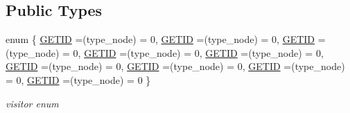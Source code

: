 \subsection*{Public Types}
\begin{DoxyCompactItemize}
\item 
enum \{ \newline
\hyperlink{structrecord__type_a2a26a4b7792dfcbb8940e4c0dac57a80a2d57bfbcb559e66da1b14d2db6e9d45d}{G\+E\+T\+ID} =(type\+\_\+node) = 0, 
\hyperlink{structrecord__type_a2a26a4b7792dfcbb8940e4c0dac57a80a2d57bfbcb559e66da1b14d2db6e9d45d}{G\+E\+T\+ID} =(type\+\_\+node) = 0, 
\hyperlink{structrecord__type_a2a26a4b7792dfcbb8940e4c0dac57a80a2d57bfbcb559e66da1b14d2db6e9d45d}{G\+E\+T\+ID} =(type\+\_\+node) = 0, 
\hyperlink{structrecord__type_a2a26a4b7792dfcbb8940e4c0dac57a80a2d57bfbcb559e66da1b14d2db6e9d45d}{G\+E\+T\+ID} =(type\+\_\+node) = 0, 
\newline
\hyperlink{structrecord__type_a2a26a4b7792dfcbb8940e4c0dac57a80a2d57bfbcb559e66da1b14d2db6e9d45d}{G\+E\+T\+ID} =(type\+\_\+node) = 0, 
\hyperlink{structrecord__type_a2a26a4b7792dfcbb8940e4c0dac57a80a2d57bfbcb559e66da1b14d2db6e9d45d}{G\+E\+T\+ID} =(type\+\_\+node) = 0, 
\hyperlink{structrecord__type_a2a26a4b7792dfcbb8940e4c0dac57a80a2d57bfbcb559e66da1b14d2db6e9d45d}{G\+E\+T\+ID} =(type\+\_\+node) = 0, 
\hyperlink{structrecord__type_a2a26a4b7792dfcbb8940e4c0dac57a80a2d57bfbcb559e66da1b14d2db6e9d45d}{G\+E\+T\+ID} =(type\+\_\+node) = 0, 
\newline
\hyperlink{structrecord__type_a2a26a4b7792dfcbb8940e4c0dac57a80a2d57bfbcb559e66da1b14d2db6e9d45d}{G\+E\+T\+ID} =(type\+\_\+node) = 0
 \}\begin{DoxyCompactList}\small\item\em visitor enum \end{DoxyCompactList}
\end{DoxyCompactItemize}
